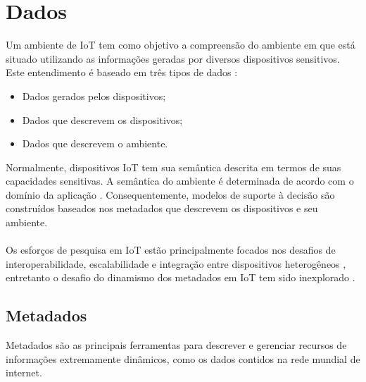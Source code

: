 \section{Dados}%
	\quad Um ambiente de \acrlong{IoT} tem como objetivo a compreensão do ambiente em que está situado utilizando as informações geradas por diversos
  dispositivos sensitivos. Este entendimento é baseado em três tipos de dados \cite{SemIOT}:
  \begin{itemize}
    \item Dados gerados pelos dispositivos;
    \item Dados que descrevem os dispositivos;
    \item Dados que descrevem o ambiente.
  \end{itemize}
  \quad Normalmente, dispositivos \acrshort{IoT} tem sua semântica descrita em termos de suas capacidades sensitivas. A semântica do ambiente
  é determinada de acordo com o domínio da aplicação \cite{IOTdata}. Consequentemente, modelos de suporte à decisão são construídos
  baseados nos metadados que descrevem os dispositivos e seu ambiente.
  \\\\ \null
  \quad
  Os esforços de pesquisa em \acrlong{IoT} estão principalmente focados nos desafios de interoperabilidade, escalabilidade e integração entre dispositivos heterogêneos \cite{IOTdata},
  entretanto o desafio do dinamismo dos metadados em \acrshort{IoT} tem sido inexplorado \cite{collaborative}.

	\subsection{Metadados}
  \quad Metadados são as principais ferramentas para descrever e gerenciar recursos de informações extremamente dinâmicos, como os dados
  contidos na rede mundial de internet.
